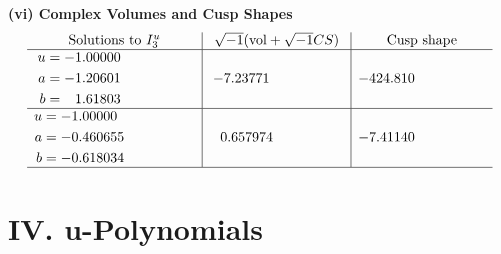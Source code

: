 \documentclass[1p]{elsarticle_modified}
\theoremstyle{definition}
\newcommand{\I}{\sqrt{-1}}
\begin{document}
\newpage\flushleft \textbf{(vi) Complex Volumes and Cusp Shapes}
$$\begin{array}{c|c|c}  
\text{Solutions to }I^u_{3}& \I (\text{vol} + \sqrt{-1}CS) & \text{Cusp shape}\\
 \hline 
\begin{aligned}
u &= -1.00000\phantom{ +0.000000I} \\
a &= -1.20601\phantom{ +0.000000I} \\
b &= \phantom{-}1.61803\phantom{ +0.000000I}\end{aligned}
 & -7.23771\phantom{ +0.000000I} & -424.810\phantom{ +0.000000I} \\ \hline\begin{aligned}
u &= -1.00000\phantom{ +0.000000I} \\
a &= -0.460655\phantom{ +0.000000I} \\
b &= -0.618034\phantom{ +0.000000I}\end{aligned}
 & \phantom{-}0.657974\phantom{ +0.000000I} & -7.41140\phantom{ +0.000000I}\\
 \hline 
 \end{array}$$\newpage
\newpage\renewcommand{\arraystretch}{1}
\centering \section*{ IV. u-Polynomials}
\end{document}
